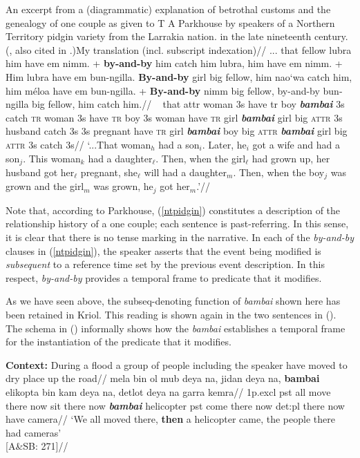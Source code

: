 \documentclass[11pt]{article}
\begin{document}
\ex\label{ntpidgin}\begingl\glpreamble \textup{An excerpt from a (diagrammatic) explanation of betrothal customs and the genealogy of one couple as given to T A Parkhouse by speakers of a Northern Territory pidgin variety from the Larrakia nation. in the late nineteenth century. (\citealt[4]{Parkhouse1895}, also cited in \citealp[299]{Harris1986a}.)My translation (incl. subscript indexation)}\vspace{.3em}//
	\gla ... that fellow lubra him have em nimm. +	\textbf{by-and-by} him catch him lubra, him have em nimm. +	Him lubra have em bun-ngilla.
	\textbf{By-and-by} girl big fellow, him nao`wa catch him, him méloa have em bun-ngilla. +	\textbf{By-and-by} nimm big fellow, by-and-by bun-ngilla big fellow, him catch him.//
	\glb ~ that {\sc attr} woman 3s have {\sc tr} boy
	\textit{\textbf{bambai}} 3s catch \textsc{tr} woman 3s have \textsc{tr} boy 3s woman have \textsc{tr} girl \textit{\textbf{bambai}} girl big \textsc{attr} 3s husband catch 3s 3s pregnant have \textsc{tr} girl \textit{\textbf{bambai}} boy big \textsc{attr} \textit{\textbf{bambai}} girl big \textsc{attr} 3s catch 3s//
	\glft `...That woman$_h$ had a son$_i$. Later, he$_i$ got a wife and had a son$_j$. This woman$_k$ had a daughter$_\ell$. Then, when the girl$_\ell$ had grown up, her husband got her$_\ell$ pregnant, she$_\ell$ will had a daughter$_m$. Then, when the boy$_j$ was grown and the girl$_m$ was grown, he$_j$ got her$_m$.'//\endgl
\xe

Note that, according to Parkhouse, (\ref{ntpidgin}) constitutes a description of the relationship history of a one couple; each sentence is past-referring. In this sense, it is clear that there is no tense marking in the narrative.  In each of the \textit{by-and-by} clauses in (\ref{ntpidgin}), the speaker asserts that the event being modified is \textit{subsequent} to a reference time set by the previous event description. In this respect, \textit{by-and-by} provides a temporal frame to predicate that it modifies. 

As we have seen above, the {\sc subseq}-denoting function of \textit{bambai} shown here has been retained in Kriol. This reading is shown again in the two sentences in (). The schema in () informally shows how the \textit{bambai} establishes a temporal frame for the instantiation of the predicate that it modifies.

\pex\a{}	\begingl	\glpreamble \textbf{Context:} During a flood a group of people including the speaker have moved to dry place up the road//
	\gla mela bin ol mub deya na, jidan deya na, \textbf{bambai} elikopta bin kam deya na, detlot deya na garra kemra//
	\glb 1p{\sc.excl} {\sc pst} all move there now sit there now \textbf{\textit{bambai}} helicopter {\sc pst} come there now {\sc det:pl} there now have camera//
	\glft `We all moved there, \textbf{then} a helicopter came, the people there had cameras'\\\hspace*{\fill}[A\&SB: 271]//
	\endgl
\end{document}

